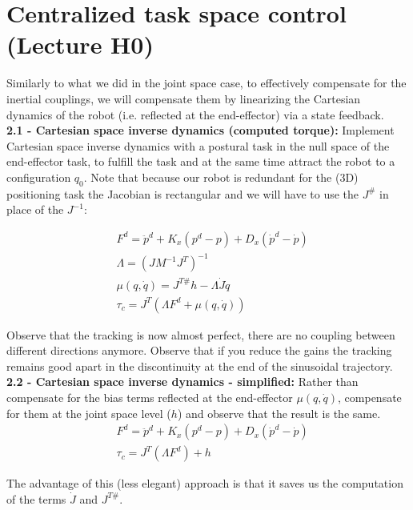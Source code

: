 \documentclass[11pt]{article}
\begin{document}
\section{Centralized task space control (Lecture H0)}

Similarly to what we did in the joint space case, to effectively compensate for the inertial couplings, we will compensate them by linearizing the Cartesian dynamics of the robot (i.e. reflected at the end-effector) via a state feedback.\\


\textbf{2.1 - Cartesian space inverse dynamics (computed torque):}
Implement Cartesian space inverse dynamics with a postural task in the null space of the end-effector task, to fulfill the task and at the same time attract the robot to a configuration $q_0$. 
Note that because our robot is redundant for the (3D) positioning task the Jacobian is rectangular and we will have to use the $J^{\#}$ in place of the $J^{-1}$:

\begin{align}
&F^d = \ddot{p}^d + K_x(p^d - p) + D_x(\dot{p}^d -\dot{p})  \\
& \Lambda = (J M^{-1}J^T)^{-1}\\
&\mu(q,\dot{q})  = J^{T\#} h -\Lambda \dot{J} \dot{q} \\
&\tau_c  = J^T\left( \Lambda F^d +  \mu(q,\dot{q}) \right)
\end{align}


Observe that the tracking is now almost perfect, there are no coupling between different directions anymore.  Observe that if you reduce the gains the tracking remains good apart in the discontinuity at the end of the sinusoidal trajectory.  \\



\textbf{2.2 - Cartesian space inverse dynamics - simplified:}
Rather than compensate for the bias terms reflected at the end-effector $\mu(q,\dot{q})$,  compensate for them at the joint space level ($h$) and observe that the result is the same. 
\begin{align}
&F^d = \ddot{p}^d + K_x(p^d - p) + D_x(\dot{p}^d -\dot{p})  \\
&\tau_c  = J^T\left( \Lambda F^d  \right) + h
\end{align}

The advantage of this (less elegant) approach is that it saves us the computation of the terms $\dot{J}$ and $J^{T\#}$.\\
\end{document}
